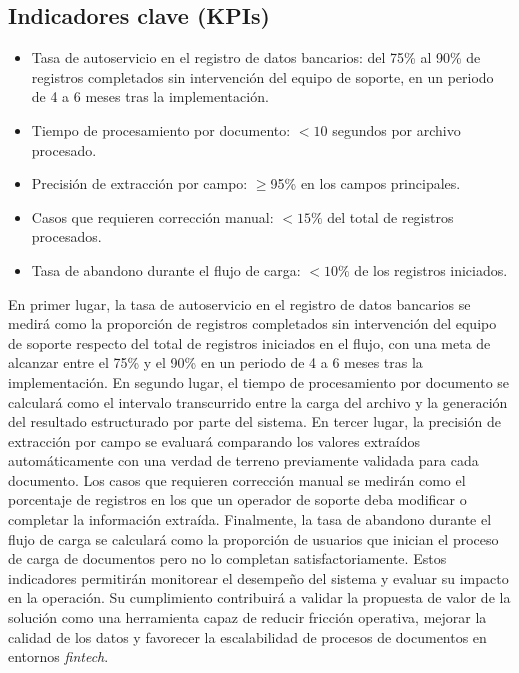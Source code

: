 \subsection*{Indicadores clave (KPIs)}
\begin{itemize}
  \item Tasa de autoservicio en el registro de datos bancarios: del 75\% al 90\% de registros completados sin intervención del equipo de soporte, en un periodo de 4 a 6 meses tras la implementación.
  \item Tiempo de procesamiento por documento: $<10$ segundos por archivo procesado.
  \item Precisión de extracción por campo: $\geq$95\% en los campos principales.
  \item Casos que requieren corrección manual: $<15\%$ del total de registros procesados.
  \item Tasa de abandono durante el flujo de carga: $<10\%$ de los registros iniciados.
\end{itemize}


\noindent En primer lugar, la tasa de autoservicio en el registro de datos bancarios se medirá como la proporción de registros completados sin intervención del equipo de soporte respecto del total de registros iniciados en el flujo, con una meta de alcanzar entre el 75\% y el 90\% en un periodo de 4 a 6 meses tras la implementación. En segundo lugar, el tiempo de procesamiento por documento se calculará como el intervalo transcurrido entre la carga del archivo y la generación del resultado estructurado por parte del sistema. En tercer lugar, la precisión de extracción por campo se evaluará comparando los valores extraídos automáticamente con una verdad de terreno previamente validada para cada documento. Los casos que requieren corrección manual se medirán como el porcentaje de registros en los que un operador de soporte deba modificar o completar la información extraída. Finalmente, la tasa de abandono durante el flujo de carga se calculará como la proporción de usuarios que inician el proceso de carga de documentos pero no lo completan satisfactoriamente. Estos indicadores permitirán monitorear el desempeño del sistema y evaluar su impacto en la operación. Su cumplimiento contribuirá a validar la propuesta de valor de la solución como una herramienta capaz de reducir fricción operativa, mejorar la calidad de los datos y favorecer la escalabilidad de procesos de documentos en entornos \textit{fintech}.

